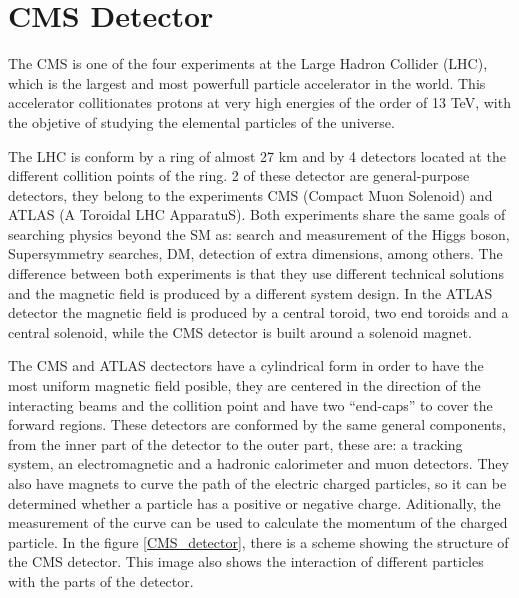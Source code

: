 \chapter{CMS Detector}

The CMS is one of the four experiments at the Large Hadron Collider (LHC), which is the largest and most powerfull particle accelerator in the world. This accelerator collitionates protons at very high energies of the order of 13 TeV, with the objetive of studying the elemental particles of the universe. 

The LHC is conform by a ring of almost 27 km and by 4 detectors located at the different collition points of the ring. 2 of these detector are general-purpose detectors, they belong to the experiments CMS (Compact Muon Solenoid) and ATLAS (A Toroidal LHC ApparatuS). Both experiments share the same goals of searching physics beyond the SM as: search and measurement of the Higgs boson, Supersymmetry searches, DM, detection of extra dimensions, among others. The difference between both experiments is that they use different technical solutions and the magnetic field is produced by a different system design. In the ATLAS detector the magnetic field is produced by a central toroid, two end toroids and a central solenoid, while the CMS detector is built around a solenoid magnet.  

The CMS and ATLAS dectectors have a cylindrical form in order to have the most uniform magnetic field posible, they are centered in the direction of the interacting beams and the collition point and have two ``end-caps'' to cover the forward regions. These detectors are conformed by the same general components, from the inner part of the detector to the outer part, these are: a tracking system, an electromagnetic and a hadronic calorimeter and muon detectors. They also have magnets to curve the path of the electric charged particles, so it can be determined whether a particle has a positive or negative charge. Aditionally, the measurement of the curve can be used to calculate the momentum of the charged particle. In the figure \ref{CMS_detector}, there is a scheme showing the structure of the CMS detector. This image also shows the interaction of different particles with the parts of the detector.


